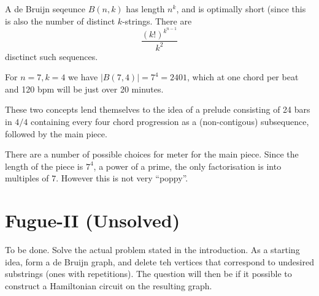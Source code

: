 \documentclass{article}
\begin{document}
A de Bruijn seqeunce $B(n,k)$ has length $n^k$, and is optimally
short (since this is also the number of distinct $k$-strings. There are 
\begin{equation*}
  \frac{\left(k!\right)^{k^{n-1}}}{k^2}
\end{equation*}
disctinct such sequences.

For $n=7, k=4$ we have $|B(7,4)|=7^4=2401$, which at one chord per beat
and 120 bpm will be just over 20 minutes.

These two concepts lend themselves to the idea of a prelude
consisting of 24 bars in $4/4$ containing every four chord progression
as a (non-contigous) subsequence, followed by the main piece.

There are a number of possible choices for meter for the main
piece. Since the length of the piece is $7^4$, a power of a prime, the
only factorisation is into multiples of $7$. However this is not very
``poppy''. 

\section{Fugue-II (Unsolved)}
To be done. Solve the actual problem stated in the introduction. As a
starting idea, form a de Bruijn graph, and delete teh vertices that
correspond to undesired substrings (ones with repetitions). The
question will then be if it possible to construct a Hamiltonian
circuit on the resulting graph.



\end{document}
